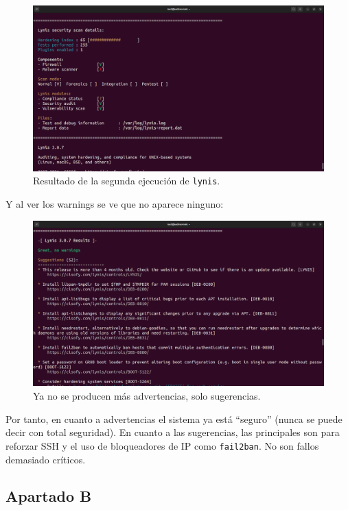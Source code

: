 \documentclass{article}
\begin{document}
\begin{figure}[H]
    \includegraphics[width=\textwidth]{imagenes/lynisresults2.png}
    \caption{Resultado de la segunda ejecución de \texttt{lynis}.}
\end{figure}


Y al ver los warnings se ve que no aparece ninguno:

\begin{figure}[H]
    \includegraphics[width=\textwidth]{imagenes/lyniswarnings2.png}
    \caption{Ya no se producen más advertencias, solo sugerencias.}
\end{figure}

Por tanto, en cuanto a advertencias el sistema ya está ``seguro'' (nunca se puede decir con total seguridad). En cuanto a las sugerencias, las principales son para reforzar SSH y el uso de bloqueadores de IP como \verb|fail2ban|. No son fallos demasiado críticos.

\bigskip

\subsection{Apartado B}
\end{document}
